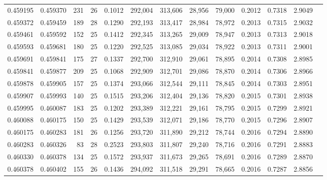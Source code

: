 \begin{tabular}{rrrrrrrrrrrrr}
0.459195 & 0.459370 & 231 &  26 &                                     0.1012 & 292,004 & 313,606 &  28,956 &  79,000 & 0.2012 & 0.7318 & 2.9049 \\
0.459372 & 0.459459 & 189 &  28 &                                     0.1290 & 292,193 & 313,417 &  28,984 &  78,972 & 0.2013 & 0.7315 & 2.9032 \\
0.459461 & 0.459592 & 152 &  25 &                                     0.1412 & 292,345 & 313,265 &  29,009 &  78,947 & 0.2013 & 0.7313 & 2.9018 \\
0.459593 & 0.459681 & 180 &  25 &                                     0.1220 & 292,525 & 313,085 &  29,034 &  78,922 & 0.2013 & 0.7311 & 2.9001 \\
0.459691 & 0.459841 & 175 &  27 &                                     0.1337 & 292,700 & 312,910 &  29,061 &  78,895 & 0.2014 & 0.7308 & 2.8985 \\
0.459841 & 0.459877 & 209 &  25 &                                     0.1068 & 292,909 & 312,701 &  29,086 &  78,870 & 0.2014 & 0.7306 & 2.8966 \\
0.459878 & 0.459905 & 157 &  25 &                                     0.1374 & 293,066 & 312,544 &  29,111 &  78,845 & 0.2014 & 0.7303 & 2.8951 \\
0.459907 & 0.459993 & 140 &  25 &                                     0.1515 & 293,206 & 312,404 &  29,136 &  78,820 & 0.2015 & 0.7301 & 2.8938 \\
0.459995 & 0.460087 & 183 &  25 &                                     0.1202 & 293,389 & 312,221 &  29,161 &  78,795 & 0.2015 & 0.7299 & 2.8921 \\
0.460088 & 0.460175 & 150 &  25 &                                     0.1429 & 293,539 & 312,071 &  29,186 &  78,770 & 0.2015 & 0.7296 & 2.8907 \\
0.460175 & 0.460283 & 181 &  26 &                                     0.1256 & 293,720 & 311,890 &  29,212 &  78,744 & 0.2016 & 0.7294 & 2.8890 \\
0.460283 & 0.460326 &  83 &  28 &                                     0.2523 & 293,803 & 311,807 &  29,240 &  78,716 & 0.2016 & 0.7291 & 2.8883 \\
0.460330 & 0.460378 & 134 &  25 &                                     0.1572 & 293,937 & 311,673 &  29,265 &  78,691 & 0.2016 & 0.7289 & 2.8870 \\
0.460378 & 0.460402 & 155 &  26 &                                     0.1436 & 294,092 & 311,518 &  29,291 &  78,665 & 0.2016 & 0.7287 & 2.8856 \\

\end{tabular}
